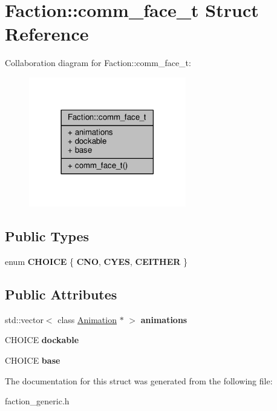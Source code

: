 \hypertarget{structFaction_1_1comm__face__t}{}\section{Faction\+:\+:comm\+\_\+face\+\_\+t Struct Reference}
\label{structFaction_1_1comm__face__t}


Collaboration diagram for Faction\+:\+:comm\+\_\+face\+\_\+t\+:
\nopagebreak
\begin{figure}[H]
\begin{center}
\leavevmode
\includegraphics[width=194pt]{dc/d2e/structFaction_1_1comm__face__t__coll__graph}
\end{center}
\end{figure}
\subsection*{Public Types}
\begin{DoxyCompactItemize}
\item 
enum {\bfseries C\+H\+O\+I\+CE} \{ {\bfseries C\+NO}, 
{\bfseries C\+Y\+ES}, 
{\bfseries C\+E\+I\+T\+H\+ER}
 \}\hypertarget{structFaction_1_1comm__face__t_ac20d67d15e4607a9a8d8e80f4cfbac13}{}\label{structFaction_1_1comm__face__t_ac20d67d15e4607a9a8d8e80f4cfbac13}

\end{DoxyCompactItemize}
\subsection*{Public Attributes}
\begin{DoxyCompactItemize}
\item 
std\+::vector$<$ class \hyperlink{classAnimation}{Animation} $\ast$ $>$ {\bfseries animations}\hypertarget{structFaction_1_1comm__face__t_a687ec41a0cad8bdad6c63730f4d1c617}{}\label{structFaction_1_1comm__face__t_a687ec41a0cad8bdad6c63730f4d1c617}

\item 
C\+H\+O\+I\+CE {\bfseries dockable}\hypertarget{structFaction_1_1comm__face__t_a705473b7d9372933b79f90f2dbc02355}{}\label{structFaction_1_1comm__face__t_a705473b7d9372933b79f90f2dbc02355}

\item 
C\+H\+O\+I\+CE {\bfseries base}\hypertarget{structFaction_1_1comm__face__t_aa9dcf8301af1696d43fe44aca43df4d9}{}\label{structFaction_1_1comm__face__t_aa9dcf8301af1696d43fe44aca43df4d9}

\end{DoxyCompactItemize}


The documentation for this struct was generated from the following file\+:\begin{DoxyCompactItemize}
\item 
faction\+\_\+generic.\+h\end{DoxyCompactItemize}
